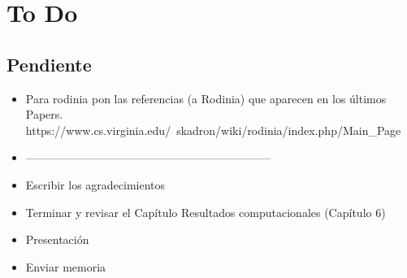 %
%
%
%


\chapter{To Do} \label{chap:to-do} 

\section{Pendiente}

\begin{itemize}
\item Para rodinia pon las referencias (a Rodinia) que aparecen en los últimos Papers. https://www.cs.virginia.edu/~skadron/wiki/rodinia/index.php/Main\_Page
\item -----------------------------------------------------------------
\item Escribir los agradecimientos
\item Terminar y revisar el Capítulo Resultados computacionales (Capítulo 6)
\item Presentación
\item Enviar memoria
\end{itemize}

